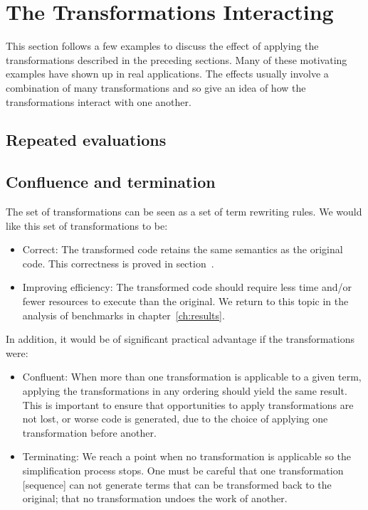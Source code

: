 \section{The Transformations Interacting}

This section follows a few examples to discuss the effect of applying the
transformations described in the preceding sections. Many of these motivating
examples have shown up in real applications. The effects usually involve a
combination of many transformations and so give an idea of how the
transformations interact with one another.

\subsection{Repeated evaluations}
\subsection{Confluence and termination}

The set of transformations can be seen as a set of term rewriting rules. We
would like this set of transformations to be:
%
\begin{itemize}
    \item Correct: The transformed code retains the same semantics as the
        original code. This correctness is proved in
        section~\derp.

    \item Improving efficiency: The transformed code should require less time
        and/or fewer resources to execute than the original. We return to this
        topic in the analysis of benchmarks in chapter~\ref{ch:results}.
\end{itemize}
%
In addition, it would be of significant practical advantage if the
transformations were:
%
\begin{itemize}
    \item Confluent: When more than one transformation is applicable to a given
        term, applying the transformations in any ordering should yield the same
        result. This is important to ensure that opportunities to apply
        transformations are not lost, or worse code is generated, due to
        the choice of applying one transformation before another.

    \item Terminating: We reach a point when no transformation is applicable so
        the simplification process stops. One must be careful that one
        transformation [sequence] can not generate terms that can be transformed
        back to the original; that no transformation undoes the work of another.
\end{itemize}

